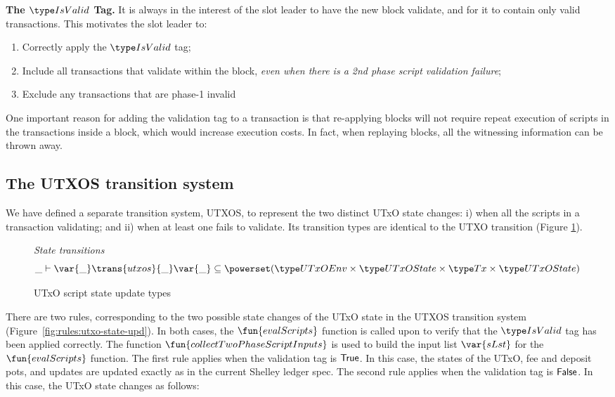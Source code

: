 \textbf{The $\IsValid$ Tag. }
It is always in the interest of the slot leader to have the new block validate,
and for it to contain only valid transactions. This motivates the
slot leader to:

\begin{enumerate}
  \item Correctly apply the $\IsValid$ tag;
  \item Include all transactions that validate within the block,
  \textit{even when there is a 2nd phase script validation failure};
  \item Exclude any transactions that are phase-1 invalid
\end{enumerate}

One important reason for adding the validation tag
to a transaction is that re-applying blocks will not require repeat
execution of scripts in the transactions inside a block, which would increase execution costs.
In fact, when replaying
blocks, all the witnessing information can be thrown away.

\subsection{The UTXOS transition system}
\label{sec:utxo-state-trans}

We have defined a separate transition system, UTXOS, to represent the two distinct
UTxO state changes: i) when all the scripts in a transaction validating; and
ii) when at least one fails to validate. Its transition types
are identical to the UTXO transition (Figure
\ref{fig:ts-types:utxo-scripts}).

\begin{figure}[htb]
  \emph{State transitions}
  \begin{equation*}
    \_ \vdash
    \var{\_} \trans{utxos}{\_} \var{\_}
    \subseteq \powerset (\UTxOEnv \times \UTxOState \times \Tx \times \UTxOState)
  \end{equation*}
  \caption{UTxO script state update types}
  \label{fig:ts-types:utxo-scripts}
\end{figure}

There are two rules, corresponding to the two possible state changes of the
UTxO state in the UTXOS transition system (Figure~\ref{fig:rules:utxo-state-upd}).
%
In both cases, the $\fun{evalScripts}$ function is called upon to verify that the $\IsValid$
tag has been applied correctly. The function $\fun{collectTwoPhaseScriptInputs}$ is used to build
the input list $\var{sLst}$ for the $\fun{evalScripts}$ function.
%
The first rule
applies when the validation tag is $\mathsf{True}$.
In this case, the states of the UTxO, fee
  and deposit pots, and updates are updated exactly as in the current Shelley
  ledger spec.
%
  The second rule
  applies when the validation tag is $\mathsf{False}$.
  In this case, the UTxO state changes as follows:

